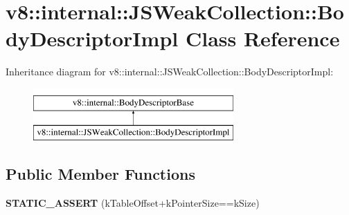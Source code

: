 \hypertarget{classv8_1_1internal_1_1JSWeakCollection_1_1BodyDescriptorImpl}{}\section{v8\+:\+:internal\+:\+:J\+S\+Weak\+Collection\+:\+:Body\+Descriptor\+Impl Class Reference}
\label{classv8_1_1internal_1_1JSWeakCollection_1_1BodyDescriptorImpl}
Inheritance diagram for v8\+:\+:internal\+:\+:J\+S\+Weak\+Collection\+:\+:Body\+Descriptor\+Impl\+:\begin{figure}[H]
\begin{center}
\leavevmode
\includegraphics[height=2.000000cm]{classv8_1_1internal_1_1JSWeakCollection_1_1BodyDescriptorImpl}
\end{center}
\end{figure}
\subsection*{Public Member Functions}
\begin{DoxyCompactItemize}
\item 
\mbox{\label{classv8_1_1internal_1_1JSWeakCollection_1_1BodyDescriptorImpl_a6221345161c3569fba61e7ccde8ad096}} 
{\bfseries S\+T\+A\+T\+I\+C\+\_\+\+A\+S\+S\+E\+RT} (k\+Table\+Offset+k\+Pointer\+Size==k\+Size)
\end{DoxyCompactItemize}
